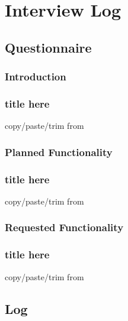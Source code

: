 \section{Interview Log}


\subsection{Questionnaire}


\subsubsection{Introduction}

\begin{frame}
\frametitle{title here}
copy/paste/trim from 
\end{frame}


\subsubsection{Planned Functionality}

\begin{frame}
\frametitle{title here}
copy/paste/trim from 
\end{frame}


\subsubsection{Requested Functionality}

\begin{frame}
\frametitle{title here}
copy/paste/trim from 
\end{frame}


\subsection{Log}

